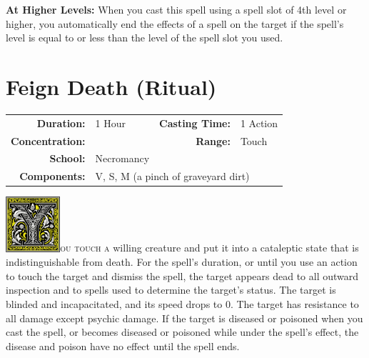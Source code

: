 \documentclass[12pt,showtrims]{memoir}
\begin{document}
\vspace{8pt} \noindent\textbf{At Higher Levels:} When you cast this spell using a spell slot of 4th level or higher, you automatically end the effects of a spell on the target if the spell's level is equal to or less than the level of the spell slot you used.

\newpage
\begin{figure}[p]
\end{figure}
\FloatBarrier

\newpage
\section*{Feign Death (Ritual)}
{
\small\centering\vspace{-6pt}
\begin{tabular}{rlrl}
\toprule

\textbf{Duration:} & 1 Hour &
\textbf{Casting Time:} & 1 Action \\
\textbf{Concentration:} & &
\textbf{Range:} & Touch \\
\textbf{School:} & Necromancy  \\
\textbf{Components:} & \multicolumn{3}{p{0.7\textwidth}}{V, S, M (a pinch of graveyard dirt)}\\

\bottomrule
\end{tabular}
}
\vspace{1\baselineskip}\noindent
\lettrine[lines=4]{\includegraphics[height=58pt]{initials/Y.png}}{ou touch a} willing creature and put it into a cataleptic state that is indistinguishable from death. For the spell’s duration, or until you use an action to touch the target and dismiss the spell, the target appears dead to all outward inspection and to spells used to determine the target’s status. The target is blinded and incapacitated, and its speed drops to 0. The target has resistance to all damage except psychic damage. If the target is diseased or poisoned when you cast the spell, or becomes diseased or poisoned while under the spell’s effect, the disease and poison have no effect until the spell ends.
\end{document}
